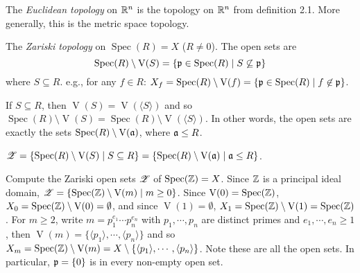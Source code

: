 \begin{example}
    The \emph{Euclidean topology} on $\mathbb{R}^n$ is the topology on $\mathbb{R}^n$ from definition 2.1. More generally, this is the metric space topology.
\end{example}

\begin{definition}
    The \emph{Zariski topology} on $\operatorname{Spec}(R) = X$ ($R \neq 0$). The open sets are 
    \[\operatorname{Spec}(R) \setminus \operatorname{V}(S) = \{\mathfrak{p} \in \operatorname{Spec}(R) \mid S \not \subseteq \mathfrak{p}\}\] 
    where $S \subseteq R$. e.g., for any $f \in R$: $X_f = \operatorname{Spec}(R) \setminus \operatorname{V}(f) = \{\mathfrak{p} \in \operatorname{Spec}(R) \mid f \not \in \mathfrak{p}\}$.
\end{definition}

\begin{proposition}
    If $S \subseteq R$, then $\operatorname{V}(S) = \operatorname{V}(\langle S \rangle)$ and so $\operatorname{Spec}(R) \setminus \operatorname{V}(S) = \operatorname{Spec}(R) \setminus \operatorname{V}(\langle S \rangle)$. In other words, the open sets are exactly the sets $\operatorname{Spec}(R) \setminus \operatorname{V}(\mathfrak{a})$, where $\mathfrak{a} \leq R$.
\end{proposition}

\begin{notation*}
    $\mathscr{Z} = \{\operatorname{Spec}(R) \setminus \operatorname{V}(S) \mid S \subseteq R\} = \{\operatorname{Spec}(R) \setminus \operatorname{V}(\mathfrak{a}) \mid \mathfrak{a} \leq R\}$.
\end{notation*}

\begin{example}
    Compute the Zariski open sets $\mathscr{Z}$ of $\operatorname{Spec}(\mathbb{Z}) = X$. Since $\mathbb{Z}$ is a principal ideal domain, $\mathscr{Z} = \{\operatorname{Spec}(\mathbb{Z}) \setminus \operatorname{V}(m) \mid m \geq 0\}$. Since $\operatorname{V}(0) = \operatorname{Spec}(\mathbb{Z})$, $X_0 = \operatorname{Spec}(\mathbb{Z}) \setminus \operatorname{V}(0) = \emptyset$, and since $\operatorname{V}(1) = \emptyset$, $X_1 = \operatorname{Spec}(\mathbb{Z}) \setminus \operatorname{V}(1) = \operatorname{Spec}(\mathbb{Z})$. For $m \geq 2$, write $m = p_1^{e_1} \cdots p_n^{e_n}$ with $p_1,\cdots,p_n$ are distinct primes and $e_1,\cdots,e_n \geq 1$, then $\operatorname{V}(m) = \{\langle p_1 \rangle, \cdots, \langle p_n \rangle\}$ and so $X_m = \operatorname{Spec}(\mathbb{Z}) \setminus \operatorname{V}(m) = X \setminus \{\langle p_1 \rangle,\cdots, \langle p_n \rangle\}$. Note these are all the open sets. In particular, $\mathfrak{p} = \{0\}$ is in every non-empty open set.
\end{example}

